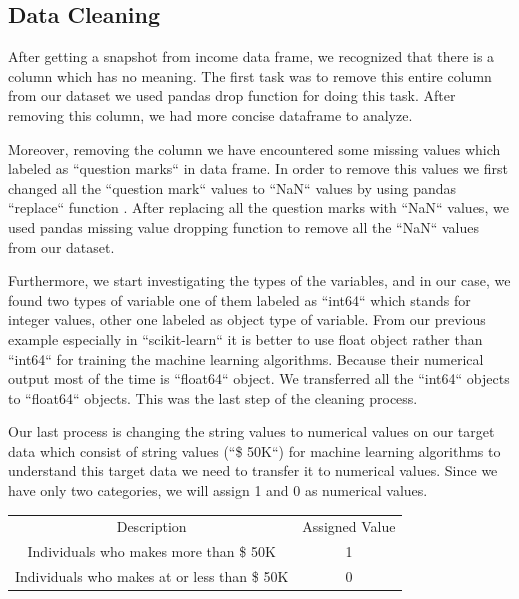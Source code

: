 \documentclass[sigconf]{acmart}
\begin{document}
\subsection{Data Cleaning}

After getting a snapshot from income data frame, we recognized that there is a column which has no meaning. The first task was to remove this entire column from our dataset we used pandas drop function for doing this task. After removing this column, we had more concise dataframe to analyze. 

\par Moreover, removing the column we have encountered some missing values which labeled as ``question marks`` in data frame. In order to remove this values we first changed all the ``question mark`` values to ``NaN`` values by using pandas ``replace`` function \cite{www-pandas.replace}. After replacing all the question marks with ``NaN`` values, we used pandas missing value dropping function to remove all the ``NaN`` values from our dataset. 

\par Furthermore, we start investigating the types of the variables, and  in our case, we found two types of variable one of them labeled as ``int64`` which stands for integer values, other one labeled as object type of variable. From our previous example especially in ``scikit-learn`` it is better to use float object rather than ``int64`` for training the machine learning algorithms. Because their numerical output most of the time is ``float64`` object. We transferred all the ``int64`` objects to ``float64`` objects. This was the last step of the cleaning process. 

\par Our last process is changing the string values to numerical values on our target data which consist of string values (``\$ 50K``) for machine learning algorithms to understand this target data we need to transfer it to numerical values. Since we have only two categories, we will assign 1 and 0 as numerical values. 

\begin{center}
\begin{tabular}{ |c|c| } 
 \hline
 Description & Assigned Value  \\ 
Individuals who makes more than \$ 50K  & 1  \\ 
Individuals who makes at or less than \$ 50K & 0  \\ 
 \hline
\end{tabular}
\end{center}
\end{document}
